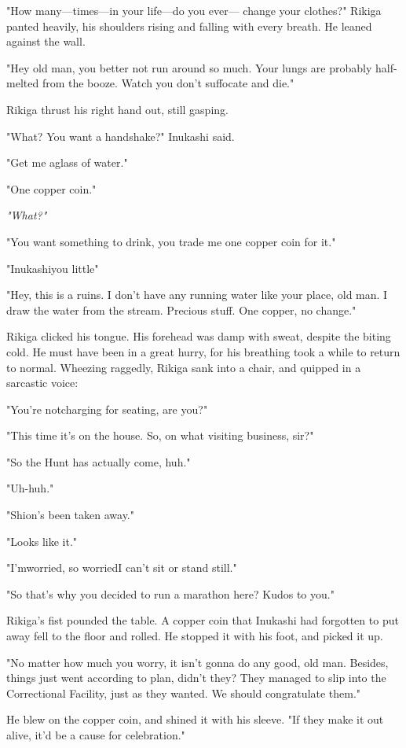 "How many---times---in your life---do you ever--- change your clothes?" Rikiga
panted heavily, his shoulders rising and falling with every breath. He
leaned against the wall.

"Hey old man, you better not run around so much. Your lungs are probably
half-melted from the booze. Watch you don't suffocate and die."

Rikiga thrust his right hand out, still gasping.

"What? You want a handshake?" Inukashi said.

"Get me a\el glass of water."

"One copper coin."

\emph{"What?"}

"You want something to drink, you trade me one copper coin for it."

"Inukashi\el you little\el "

"Hey, this is a ruins. I don't have any running water like your place,
old man. I draw the water from the stream. Precious stuff. One copper,
no change."

Rikiga clicked his tongue. His forehead was damp with sweat, despite the
biting cold. He must have been in a great hurry, for his breathing took
a while to return to normal. Wheezing raggedly, Rikiga sank into a
chair, and quipped in a sarcastic voice:

"You're not\el charging for seating, are you?"

"This time it's on the house. So, on what visiting business, sir?"

"So the Hunt has actually come, huh."

"Uh-huh."

"Shion's been taken away."

"Looks like it."

"I'm\el worried, so worried\el I can't sit or stand still."

"So that's why you decided to run a marathon here? Kudos to you."

Rikiga's fist pounded the table. A copper coin that Inukashi had
forgotten to put away fell to the floor and rolled. He stopped it with
his foot, and picked it up.

"No matter how much you worry, it isn't gonna do any good, old man.
Besides, things just went according to plan, didn't they? They managed
to slip into the Correctional Facility, just as they wanted. We should
congratulate them."

He blew on the copper coin, and shined it with his sleeve. "If they make
it out alive, it'd be a cause for celebration."

